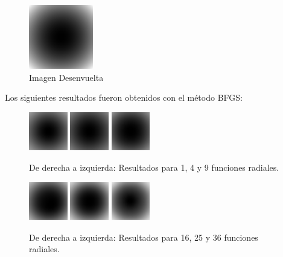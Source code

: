 \documentclass[10pt,journal,compsoc]{styles/IEEEtran}
\begin{document}
\begin{figure}[H]
\centering
\includegraphics[width=0.25\textwidth]{phase.png}
\caption{Imagen Desenvuelta}
\end{figure}

Los siguientes resultados fueron obtenidos con el método BFGS:\\

\begin{figure}[H]
	\centering
	\includegraphics[width=0.15\textwidth]{BFGS1.png}
	\includegraphics[width=0.15\textwidth]{BFGS2.png}
	\includegraphics[width=0.15\textwidth]{BFGS3.png}
	
	\caption{De derecha a izquierda: Resultados para 1, 4 y 9 funciones radiales.}
\end{figure}

\begin{figure}[H]
	\centering
	\includegraphics[width=0.15\textwidth]{BFGS4.png}
	\includegraphics[width=0.15\textwidth]{BFGS5.png}
	\includegraphics[width=0.15\textwidth]{BFGS6.png}
	
	\caption{De derecha a izquierda: Resultados para 16, 25 y 36 funciones radiales. }
\end{figure}
\end{document}
